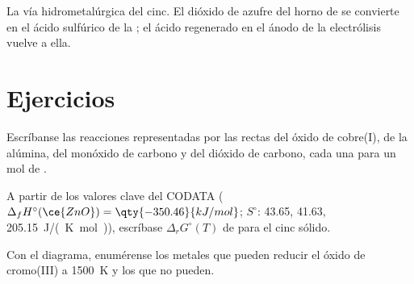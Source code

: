 \begin{omfigure}

{\small La vía hidrometalúrgica del cinc. El dióxido de azufre del horno de 
se convierte en el ácido sulfúrico de la ; el ácido regenerado en el
ánodo de la electrólisis vuelve a ella.}
\end{omfigure}

\section{Ejercicios}

\begin{exercise}[$\star$]\label{exo:b2:ellingham:1}
Escríbanse las reacciones representadas por las rectas del óxido de cobre(I), de la alúmina, del
monóxido de carbono y del dióxido de carbono, cada una para un mol de .
\end{exercise}

\begin{exercise}[$\star$]\label{exo:b2:ellingham:2}
A partir de los valores clave del CODATA ($\Delta_f H^\circ(\ce{ZnO}) = \qty{-350.46}{kJ/mol}$;
$S^\circ$:  43.65,  41.63,  \qty{205.15}{J/(K.mol)}),
escríbase $\Delta_r G^\circ(T)$ de  para el cinc sólido.
\end{exercise}

\begin{exercise}[$\star$]\label{exo:b2:ellingham:3}
Con el diagrama, enumérense los metales que pueden reducir el óxido de cromo(III) a
\qty{1500}{K} y los que no pueden.
\end{exercise}

